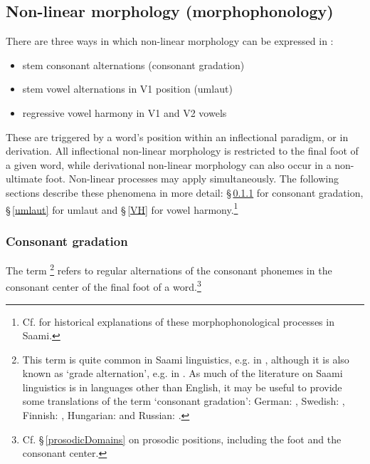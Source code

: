 \subsection{Non-linear morphology (morphophonology)}\label{morphophonology}
There are three ways %
in which non-linear morphology can be expressed in \PS:
\begin{itemize}
\item{stem consonant alternations (consonant gradation)}
\item{stem vowel alternations in V1 position (umlaut)}
\item{regressive vowel harmony in V1 and V2 vowels}
\end{itemize}
These are triggered by a word’s position %
within an inflectional paradigm, or in derivation. All inflectional non-linear morphology is restricted to the final foot of a given word, while derivational non-linear morphology can also occur in a non-ultimate foot. Non-linear processes may apply simultaneously. The following sections describe these phenomena in more detail: §\,\ref{Cgrad} for consonant gradation, §\,\ref{umlaut} for umlaut and §\,\ref{VH} for vowel harmony.\footnote{Cf. \citet{Korhonen1969} for historical explanations of these morphophonological processes in Saami.} 


\subsubsection{Consonant gradation}\label{Cgrad}
The term \footnote{This term is quite common in Saami linguistics, e.g. in \citet{Feist2010}, although it is also known as ‘grade alternation’, e.g. in \citet{Sammallahti1998}. As much of the literature on Saami linguistics is in languages other than English, it may be useful to provide some translations of the term ‘consonant gradation’: German: , Swedish: , Finnish: , Hungarian:  and Russian: .} 
refers to regular alternations of the consonant phonemes in the consonant center of the final foot of a word.\footnote{Cf. §\,\ref{prosodicDomains} on prosodic positions, including the foot and the consonant center.} 

